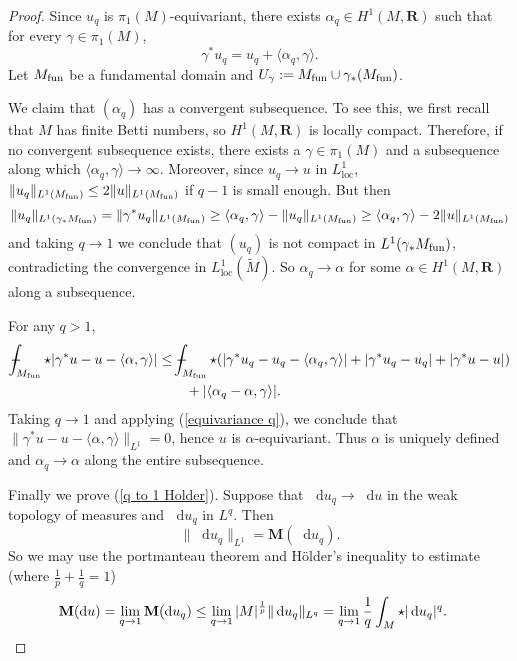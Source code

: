 \documentclass[reqno,11pt]{amsart}
\newcommand{\RR}{\mathbf{R}}
\newcommand*\dif{\mathop{}\!\mathrm{d}}
\newcommand{\Mass}{\mathbf M}
\newcommand{\loc}{\mathrm{loc}}
\theoremstyle{definition}
\numberwithin{equation}{section}
\def\Xint#1{\mathchoice
{\XXint\displaystyle\textstyle{#1}}%
{\XXint\textstyle\scriptstyle{#1}}%
{\XXint\scriptstyle\scriptscriptstyle{#1}}%
{\XXint\scriptscriptstyle\scriptscriptstyle{#1}}%
\!\int}
\def\XXint#1#2#3{{\setbox0=\hbox{$#1{#2#3}{\int}$ }
\vcenter{\hbox{$#2#3$ }}\kern-.6\wd0}}
\def\dashint{\Xint-}
\begin{document}
\begin{proof}
Since $u_q$ is $\pi_1(M)$-equivariant, there exists $\alpha_q \in H^1(M, \RR)$ such that for every $\gamma \in \pi_1(M)$,
\begin{equation}\label{equivariance q}
	\gamma^* u_q = u_q + \langle \alpha_q, \gamma\rangle.
\end{equation}
Let $M_{\rm fun}$ be a fundamental domain and $U_\gamma := M_{\rm fun} \cup \gamma_* (M_{\rm fun})$.

We claim that $(\alpha_q)$ has a convergent subsequence.
To see this, we first recall that $M$ has finite Betti numbers, so $H^1(M, \RR)$ is locally compact.
Therefore, if no convergent subsequence exists, there exists a $\gamma \in \pi_1(M)$ and a subsequence along which $\langle \alpha_q, \gamma\rangle \to \infty$.
Moreover, since $u_q \to u$ in $L^1_\loc$, $\|u_q\|_{L^1(M_{\rm fun})} \leq 2\|u\|_{L^1(M_{\rm fun})}$ if $q - 1$ is small enough.
But then 
$$\|u_q\|_{L^1(\gamma_* M_{\rm fun})} = \|\gamma^* u_q\|_{L^1(M_{\rm fun})} \geq \langle \alpha_q, \gamma\rangle - \|u_q\|_{L^1(M_{\rm fun})} \geq \langle \alpha_q, \gamma\rangle - 2\|u\|_{L^1(M_{\rm fun})}$$
and taking $q \to 1$ we conclude that $(u_q)$ is not compact in $L^1(\gamma_* M_{\rm fun})$, contradicting the convergence in $L^1_\loc(\tilde M)$.
So $\alpha_q \to \alpha$ for some $\alpha \in H^1(M, \RR)$ along a subsequence.

For any $q > 1$,
\begin{align*}
\dashint_{M_{\rm fun}} \star |\gamma^* u - u - \langle \alpha, \gamma\rangle| 
&\leq \dashint_{M_{\rm fun}} \star (|\gamma^* u_q - u_q - \langle \alpha_q, \gamma\rangle| + |\gamma^* u_q - u_q| + |\gamma^* u - u|) \\
&\qquad + |\langle \alpha_q - \alpha, \gamma\rangle|.
\end{align*}
Taking $q \to 1$ and applying (\ref{equivariance q}), we conclude that $\|\gamma^* u - u - \langle \alpha, \gamma\rangle\|_{L^1} = 0$, hence $u$ is $\alpha$-equivariant.
Thus $\alpha$ is uniquely defined and $\alpha_q \to \alpha$ along the entire subsequence.

Finally we prove (\ref{q to 1 Holder}).
Suppose that $\dif u_q \to \dif u$ in the weak topology of measures and $\dif u_q$ in $L^q$.
Then
$$\|\dif u_q\|_{L^1} = \Mass(\dif u_q).$$
So we may use the portmanteau theorem and H\"older's inequality to estimate (where $\frac{1}{p} + \frac{1}{q} = 1$)
\begin{align*}
\Mass(\dif u) &= \lim_{q \to 1} \Mass(\dif u_q) \leq \lim_{q \to 1} |M|^{\frac{1}{p}} \|\dif u_q\|_{L^q} = \lim_{q \to 1} \frac{1}{q} \int_M \star |\dif u_q|^q. \qedhere
\end{align*}
\end{proof}
\end{document}
